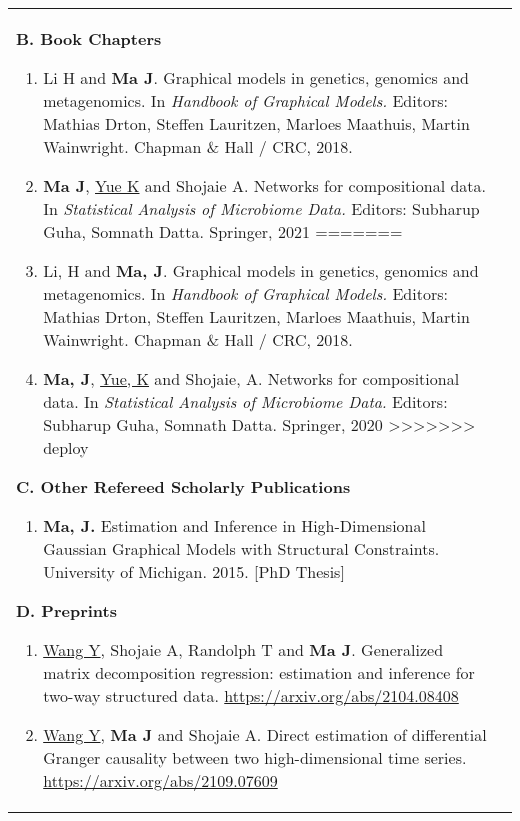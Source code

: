 \documentclass[10pt]{article}
\begin{document}
\begin{table}[H]
\begin{tabular}{p{1.6cm}p{12cm}}
\textbf{B. Book Chapters}
\begin{enumerate}
<<<<<<< HEAD
\item Li H and \textbf{Ma J}. Graphical models in genetics, genomics and metagenomics. In {\em Handbook of Graphical Models.} Editors: Mathias Drton, Steffen Lauritzen, Marloes Maathuis, Martin Wainwright. Chapman \& Hall / CRC, 2018.
\item \textbf{Ma J}, \underline{Yue K} and Shojaie A. Networks for compositional data. In \emph{Statistical Analysis of Microbiome Data.} Editors: Subharup Guha, Somnath Datta. Springer, 2021
=======
\item Li, H and \textbf{Ma, J}. Graphical models in genetics, genomics and metagenomics. In {\em Handbook of Graphical Models.} Editors: Mathias Drton, Steffen Lauritzen, Marloes Maathuis, Martin Wainwright. Chapman \& Hall / CRC, 2018.
\item \textbf{Ma, J}, \underline{Yue, K} and Shojaie, A. Networks for compositional data. In \emph{Statistical Analysis of Microbiome Data.} Editors: Subharup Guha, Somnath Datta. Springer, 2020
>>>>>>> deploy
\end{enumerate}

\textbf{C. Other Refereed Scholarly Publications}
\begin{enumerate}
\item \textbf{Ma, J.} Estimation and Inference in High-Dimensional Gaussian Graphical Models  with Structural Constraints. University of Michigan. 2015. [PhD Thesis]
\end{enumerate}

\textbf{D.  Preprints}
\begin{enumerate}
<<<<<<< HEAD
\item \underline{Wang Y}, Shojaie A, Randolph T and \textbf{Ma J}. Generalized matrix decomposition regression: estimation and inference for two-way structured data. \url{https://arxiv.org/abs/2104.08408}
\item \underline{Wang Y}, \textbf{Ma J} and Shojaie A. Direct estimation of differential Granger causality between two high-dimensional time series.  \url{https://arxiv.org/abs/2109.07609}
\end{enumerate}


\end{tabular}
\end{table}
\end{document}
